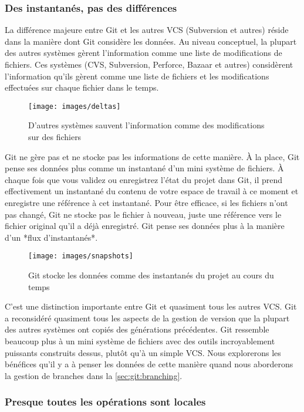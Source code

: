 \subsubsection{Des instantanés, pas des différences}

La différence majeure entre Git et les autres VCS (Subversion et autres) réside dans la manière dont Git considère les données.
Au niveau conceptuel, la plupart des autres systèmes gèrent l'information comme une liste de modifications de fichiers.
Ces systèmes (CVS, Subversion, Perforce, Bazaar et autres) considèrent l'information qu'ils gèrent comme une liste de fichiers et les modifications effectuées sur chaque fichier dans le temps.

\begin{figure}[H]
  \centering
  \texttt{[image: images/deltas]}
  \caption{D'autres systèmes sauvent l'information comme des modifications sur des fichiers}
  \label{fig:git:deltas}
\end{figure}

Git ne gère pas et ne stocke pas les informations de cette manière.
À la place, Git pense ses données plus comme un instantané d'un mini système de fichiers.
À chaque fois que vous validez ou enregistrez l'état du projet dans Git, il prend effectivement un instantané du contenu de votre espace de travail à ce moment et enregistre une référence à cet instantané.
Pour être efficace, si les fichiers n'ont pas changé, Git ne stocke pas le fichier à nouveau, juste une référence vers le fichier original qu'il a déjà enregistré.
Git pense ses données plus à la manière d'un *flux d'instantanés*.

\begin{figure}[H]
  \centering
  \texttt{[image: images/snapshots]}
  \caption{Git stocke les données comme des instantanés du projet au cours du temps}
  \label{fig:git:snapshots}
\end{figure}

C'est une distinction importante entre Git et quasiment tous les autres VCS.
Git a reconsidéré quasiment tous les aspects de la gestion de version que la plupart des autres systèmes ont copiés des générations précédentes.
Git ressemble beaucoup plus à un mini système de fichiers avec des outils incroyablement puissants construits dessus, plutôt qu'à un simple VCS.
Nous explorerons les bénéfices qu'il y a à penser les données de cette manière quand nous aborderons la gestion de branches dans la \autoref{sec:git:branching}.

\subsubsection{Presque toutes les opérations sont locales}

